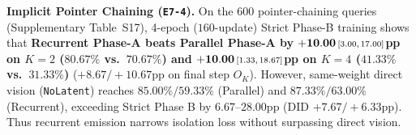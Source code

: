 \textbf{Implicit Pointer Chaining (\texttt{E7-4}).} On the $600$ pointer-chaining queries (Supplementary Table~S17), 4-epoch ($160$-update) Strict Phase-B training shows that \textbf{Recurrent Phase-A beats Parallel Phase-A by $\mathbf{+10.00}\ci{3.00}{17.00}$\textbf{pp} on $K=2$ ($80.67\%$ vs.\ $70.67\%$) and $\mathbf{+10.00}\ci{1.33}{18.67}$\textbf{pp} on $K=4$ ($41.33\%$ vs.\ $31.33\%$)} ($+8.67/+10.67$pp on final step $O_K$). However, same-weight direct vision (\texttt{NoLatent}) reaches $85.00\%/59.33\%$ (Parallel) and $87.33\%/63.00\%$ (Recurrent), exceeding Strict Phase B by $6.67$--$28.00$pp (DID $+7.67/+6.33$pp). Thus recurrent emission narrows isolation loss without surpassing direct vision.
